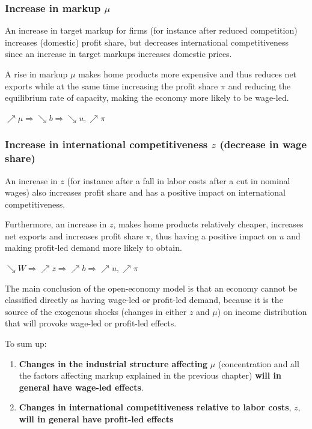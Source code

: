 \documentclass[
  letterpaper,
  DIV=11,
  numbers=noendperiod]{scrreprt}
\begin{document}
\hypertarget{increase-in-markup-mu}{%
\subsubsection{\texorpdfstring{Increase in markup
\(\mu\)}{Increase in markup \textbackslash mu}}\label{increase-in-markup-mu}}

An increase in target markup for firms (for instance after reduced
competition) increases (domestic) profit share, but decreases
international competitiveness since an increase in target markups
increases domestic prices.

A rise in markup \(\mu\) makes home products more expensive and thus
reduces net exports while at the same time increasing the profit share
\(\pi\) and reducing the equilibrium rate of capacity, making the
economy more likely to be wage-led.

\(\nearrow{\mu} \Rightarrow \searrow{b} \Rightarrow \searrow{u}, \nearrow \pi\)

\hypertarget{increase-in-international-competitiveness-z-decrease-in-wage-share}{%
\subsubsection{\texorpdfstring{Increase in international competitiveness
\(z\) (decrease in wage
share)}{Increase in international competitiveness z (decrease in wage share)}}\label{increase-in-international-competitiveness-z-decrease-in-wage-share}}

An increase in \(z\) (for instance after a fall in labor costs after a
cut in nominal wages) also increases profit share and has a positive
impact on international competitiveness.

Furthermore, an increase in \(z\), makes home products relatively
cheaper, increases net exports and increases profit share \(\pi\), thus
having a positive impact on \(u\) and making profit-led demand more
likely to obtain.

\(\searrow{W} \Rightarrow \nearrow{z} \Rightarrow \nearrow{b} \Rightarrow \nearrow{u}, \nearrow \pi\)

The main conclusion of the open-economy model is that an economy cannot
be classified directly as having wage-led or profit-led demand, because
it is the source of the exogenous shocks (changes in either \(z\) and
\(\mu\)) on income distribution that will provoke wage-led or profit-led
effects.

To sum up:

\begin{enumerate}
\def\labelenumi{\arabic{enumi}.}
\item
  \textbf{Changes in the industrial structure affecting} \(\mu\)
  (concentration and all the factors affecting markup explained in the
  previous chapter) \textbf{will in general have wage-led effects}.
\item
  \textbf{Changes in international competitiveness relative to labor
  costs}, \(z\), \textbf{will in general have profit-led effects}
\end{enumerate}
\end{document}
